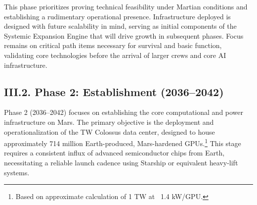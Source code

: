 \documentclass[fontsize=10pt, oneside, DIV=calc]{scrartcl}
\begin{document}
\begin{comment}
@startuml
!theme materia-outline
scale 1.6

skinparam defaultFontColor black
skinparam backgroundColor white


scale 1.6

skinparam defaultFontColor black
skinparam backgroundColor white


title ``Phase 1: Foundation (2028-2035)\nKey Milestones Flow''

component ``Earth Proto/Valid'' as EPV
component ``Initial Mars Launches'' as IML
component ``Deploy Solar'' as DS
component ``Deploy Habitat'' as DH
component ``Deploy Comms'' as DC
component ``Deploy Dojo'' as DD
component ``Initial Power'' as IP
component ``Basic Life Support'' as BLS
component ``Initial AI Ops'' as AIO
component ``ISRU Experiments'' as ISRU
component ``Pathfinder Complete'' as PC

EPV --> IML

IML --> DS
IML --> DH
IML --> DC
IML --> DD

DS --> IP
DH --> BLS
DD --> AIO

IP --> ISRU
BLS --> ISRU
AIO --> ISRU

ISRU --> PC

@enduml
\end{comment}


\medskip

\noindent
This phase prioritizes proving technical feasibility under Martian conditions and establishing a rudimentary operational presence. Infrastructure deployed is designed with future scalability in mind, serving as initial components of the Systemic Expansion Engine that will drive growth in subsequent phases. Focus remains on critical path items necessary for survival and basic function, validating core technologies before the arrival of larger crews and core AI infrastructure.



\subsection*{III.2. Phase 2: Establishment (2036–2042)}



\medskip

\noindent
Phase 2 (2036--2042) focuses on establishing the core computational and power infrastructure on Mars. The primary objective is the deployment and operationalization of the TW Colossus data center, designed to house approximately 714 million Earth-produced, Mars-hardened GPUs.\footnote{Based on approximate calculation of 1 TW at ~1.4 kW/GPU.} This stage requires a consistent influx of advanced semiconductor chips from Earth, necessitating a reliable launch cadence using Starship or equivalent heavy-lift systems.
\end{document}
